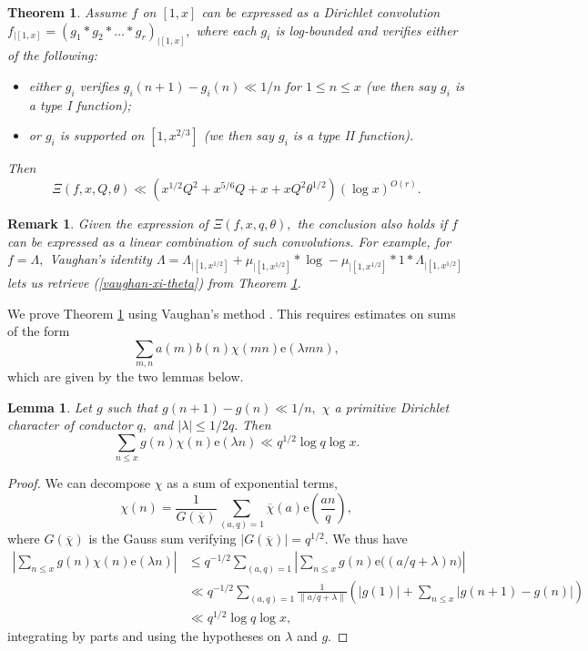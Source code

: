 \documentclass{article}
\newtheorem{theorem}[prop]{Theorem}
\newtheorem{lemma}[prop]{Lemma}
\newtheorem*{remark}{Remark}
\newcommand{\e}{\mathrm{e}}
\begin{document}
\begin{theorem}\label{main-bv}
    Assume $f$ on $[1,x]$ can be expressed as a Dirichlet convolution $f_{|[1,x]} = (g_1 * g_2 * \ldots * g_r)_{|[1,x]},$ where each $g_i$ is log-bounded and verifies either of the following:
    \begin{itemize}
        \item either $g_i$ verifies $g_i(n+1) - g_i(n) \ll 1/n$ for $1\le n\le x$ (we then say $g_i$ is a type I function);
        \item or $g_i$ is supported on $\left[1, x^{2/3}\right]$ (we then say $g_i$ is a type II function). 
    \end{itemize}

    Then $$\Xi(f, x, Q, \theta) \ll \left(x^{1/2}Q^2 + x^{5/6}Q + x + xQ^2\theta^{1/2}\right)(\log x)^{O(r)}.$$
\end{theorem}
\begin{remark}
    Given the expression of $\Xi(f, x, q, \theta),$ the conclusion also holds if $f$ can be expressed as a linear combination of such convolutions. For example, for $f = \Lambda,$ Vaughan's identity $\Lambda = \Lambda_{|[1, x^{1/2}]} + \mu_{|[1, x^{1/2}]} * \log - \mu_{|[1, x^{1/2}]} * 1 * \Lambda_{|[1, x^{1/2}]}$ lets us retrieve (\ref{vaughan-xi-theta}) from Theorem \ref{main-bv}.
\end{remark}
We prove Theorem \ref{main-bv} using Vaughan's method \cite{vaughan-bv}. This requires estimates on sums of the form $$\sum_{m,n} a(m) b(n) \chi(mn) \e(\lambda mn),$$ which are given by the two lemmas below.

\begin{lemma}\label{type-I}
    Let $g$ such that $g(n+1) - g(n) \ll 1/n,$ $\chi$ a primitive Dirichlet character of conductor $q,$ and $|\lambda|\le 1/2q.$ Then $$\sum_{n\le x} g(n) \chi(n) \e(\lambda n) \ll q^{1/2} \log q \log x.$$
\end{lemma}
\begin{proof}
    We can decompose $\chi$ as a sum of exponential terms, $$\chi(n) =  \frac{1}{G(\overline{\chi})} \sum_{(a,q) = 1} \overline{\chi}(a) \e\left(\frac{an}{q}\right),$$ where $G(\overline{\chi})$ is the Gauss sum verifying $|G(\overline\chi)| = q^{1/2}.$ We thus have 
    \begin{align*}
        \left|\sum_{n\le x} g(n) \chi(n) \e(\lambda n)\right| &\le q^{-1/2} \sum_{(a,q) = 1} \left|\sum_{n\le x} g(n) \e\big((a/q+\lambda) n\big)\right| \\&\ll q^{-1/2} \sum_{(a,q) = 1} \frac{1}{\|a/q + \lambda\|} \left(|g(1)| + \sum_{n\le x} \big|g(n+1) - g(n)\big|\right)
        \\&\ll q^{1/2} \log q\log x,
    \end{align*}
    integrating by parts and using the hypotheses on $\lambda$ and $g.$
\end{proof}
\end{document}
